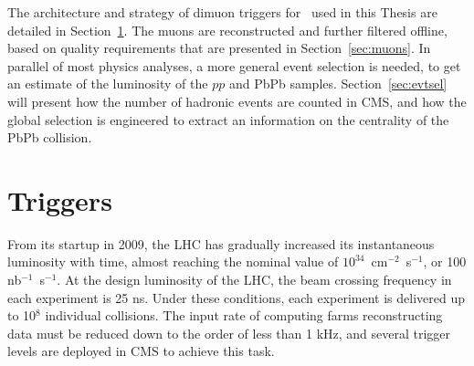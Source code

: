 The architecture and strategy of dimuon triggers for \PgU\ used in
this Thesis are detailed in Section~\ref{sec:triggers}. The muons
are reconstructed and further filtered offline, based on quality
requirements that are presented in Section~\ref{sec:muons}. In parallel of
most physics analyses, a more general event selection is needed, to
get an estimate of the luminosity of the $pp$ and PbPb
samples. Section~\ref{sec:evtsel} will present how the
number of hadronic events are counted in CMS, and how the global
selection is engineered to extract an information on the centrality of
the PbPb collision.%


\section{Triggers}
\label{sec:triggers}







From its startup in 2009, the LHC has
gradually increased its instantaneous luminosity with time, almost
reaching the nominal value of $10^{34}$~cm$^{-2}$~s$^{-1}$, or 100 nb$^{-1}$~s$^{-1}$.
At the design luminosity of the LHC, the beam crossing frequency in
each experiment is 25 ns. Under these conditions, each experiment is
delivered up to 10$^{8}$ individual collisions. The input rate of
computing farms reconstructing data must be
reduced down to the order of less than 1 kHz, and several trigger levels are deployed in CMS
to achieve this task.




